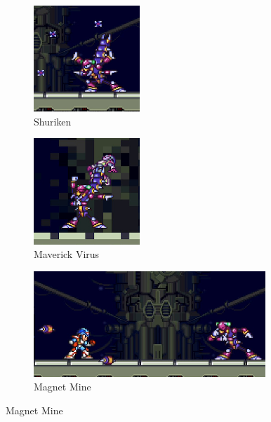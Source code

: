 \begin{figure}[htp]
	\centering
	\begin{subfigure}{0.4\linewidth}
		\centering
		\includegraphics[height=4cm]{figures/X2/Magna_centipede/Centipede_shuriken.png}
		\caption{Shuriken}
	\end{subfigure}
	\begin{subfigure}{0.4\linewidth}
		\centering
		\includegraphics[height=4cm]{figures/X2/Magna_centipede/Centipede_injection.png}
		\caption{Maverick Virus}
	\end{subfigure}
	\begin{subfigure}{\linewidth}
		\centering
		\includegraphics[height= 4cm]{figures/X2/Magna_centipede/Centipede_magnet.png}
		\caption{Magnet Mine}
	\end{subfigure}
\end{figure}

